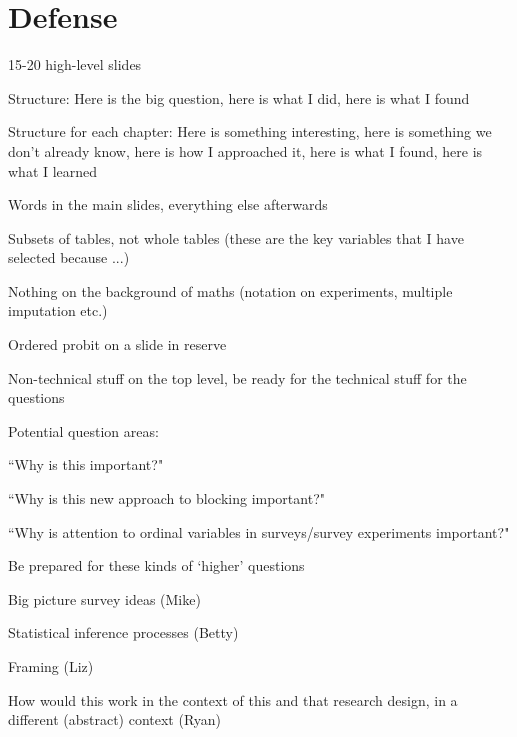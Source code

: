 \documentclass[12pt]{article}
\begin{document}
\section*{Defense}
	\begin{coi}
		\item 15-20 high-level slides
		\item Structure: Here is the big question, here is what I did, here is what I found
		\item Structure for each chapter: Here is something interesting, here is something we don't already know, here is how I approached it, here is what I found, here is what I learned
		\item Words in the main slides, everything else afterwards
		\item Subsets of tables, not whole tables (these are the key variables that I have selected because ...)
		\item Nothing on the background of maths (notation on experiments, multiple imputation etc.)
		\item Ordered probit on a slide in reserve
		\item Non-technical stuff on the top level, be ready for the technical stuff for the questions
		\item Potential question areas:
			\begin{coi}
				\item ``Why is this important?"
				\item ``Why is this new approach to blocking important?"
				\item ``Why is attention to ordinal variables in surveys/survey experiments important?"
				\item Be prepared for these kinds of `higher' questions
				\item Big picture survey ideas (Mike)
				\item Statistical inference processes (Betty)
				\item Framing (Liz)
				\item How would this work in the context of this and that research design, in a different (abstract) context (Ryan)
			\end{coi}
	\end{coi}
\end{document}
